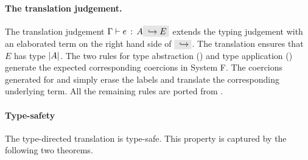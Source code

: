 \paragraph{The translation judgement.} 
The translation judgement $\jtype \Gamma e A \yields E$ extends the
typing judgement with an elaborated term on the right hand side of
$\yields {}$.  The translation ensures that $E$ has type $\lvert A \rvert$.  
The two rules for type abstraction () and type
application () generate the expected
corresponding coercions in System F.  
The coercions generated for  and  
simply erase the labels and translate the corresponding underlying term. 
All the remaining rules are ported from \oldname. 




\paragraph{Type-safety}
The type-directed translation is type-safe. This property is captured
by the following two theorems.

